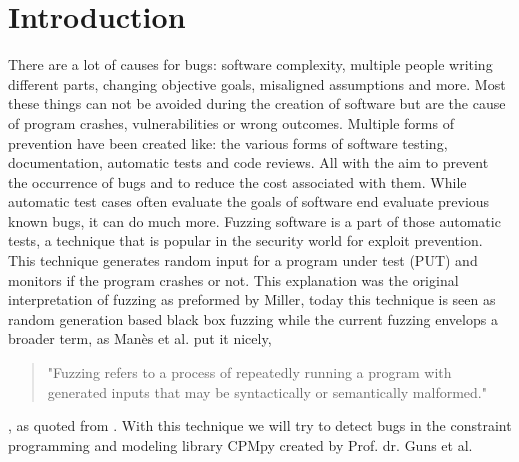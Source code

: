 \chapter{Introduction}
\label{cha:intro}
There are a lot of causes for bugs: software complexity, multiple people writing different parts, changing objective goals, misaligned assumptions and more. Most these things can not be avoided during the creation of software but are the cause of program crashes, vulnerabilities or wrong outcomes. Multiple forms of prevention have been created like: the various forms of software testing, documentation, automatic tests and code reviews. All with the aim to prevent the occurrence of bugs and to reduce the cost associated with them. While automatic test cases often evaluate the goals of software end evaluate previous known bugs, it can do much more. Fuzzing software is a part of those automatic tests, a technique that is popular in the security world for exploit prevention. This technique generates random input for a program under test (PUT) and monitors if the program crashes or not. This explanation was the original interpretation of fuzzing as preformed by Miller\cite{4originalFuzzingUnixUtils}, today this technique is seen as random generation based black box fuzzing while the current fuzzing envelops a broader term, as Man\`es et al.\cite{13manes2019survey} put it nicely,
\begin{quote}
"Fuzzing refers to a process of repeatedly running a program with generated inputs that may be syntactically or semantically malformed."
\end{quote}, as quoted from \cite{13manes2019survey}.
With this technique we will try to detect bugs in the constraint programming and modeling library CPMpy \cite{17guns2019increasing} created by Prof. dr. Guns et al.



